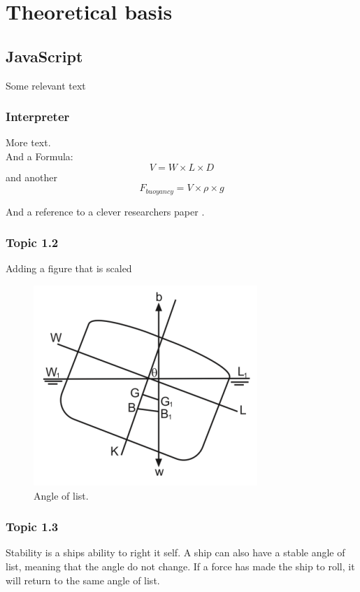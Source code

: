 \chapter{Theoretical basis}

\section{JavaScript}

Some relevant text

\subsection{Interpreter}
More text. \\
And a Formula:
\begin{equation}
V=W\times L\times D
\label{eq1}
\end{equation}
and another
\begin{equation}
F_{buoyancy}=V\times \rho\times g
\label{eq1}
\end{equation}

And a reference to a clever researchers paper \citep{hydrodynamics}.

\subsection{Topic 1.2}
Adding a figure that is scaled
\begin{figure}[h]
\centering
\includegraphics[scale=0.8]{fig/AngleOfList}
\caption{Angle of list.}
\label{fig1}
\end{figure}

\subsection{Topic 1.3} \label{stability}
Stability is a ships ability to right it self. 
A ship can also have a stable angle of list, meaning that the angle do not change. If a force has made the ship to roll, it will return to the same angle of list.

